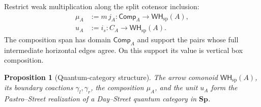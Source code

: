 \documentclass[oneside]{article}
\newcommand{\WH}{\mathsf{WH}}
\newcommand{\Sp}{\mathbf{Sp}}
\theoremstyle{plain}
\newtheorem{proposition}[theorem]{Proposition}
\theoremstyle{definition}
\theoremstyle{remark}
\begin{document}
Restrict weak multiplication along the split cotensor inclusion:
\begin{align}
    \mu_A
    &:=
    m\,j_A:
    \mathsf{Comp}_A
    \longrightarrow
    \WH_{\mathrm{sp}}(A),
    \label{eq:cgqg-ps-local-composition}\\
    u_A
    &:=
    i_s:
    C_A
    \longrightarrow
    \WH_{\mathrm{sp}}(A).
    \label{eq:cgqg-ps-local-unit}
\end{align}
The composition span has domain \(\mathsf{Comp}_A\) and support the pairs whose full intermediate horizontal edges agree. On this support its value is vertical box composition.

\begin{proposition}[Quantum-category structure]
\label{prop:cgqg-local-pastro-street}
    The arrow comonoid \(\WH_{\mathrm{sp}}(A)\), its boundary coactions \(\gamma_l,\gamma_r\), the composition \(\mu_A\), and the unit \(u_A\) form the Pastro--Street realization of a Day--Street quantum category in \(\Sp\).
\end{proposition}
\end{document}
